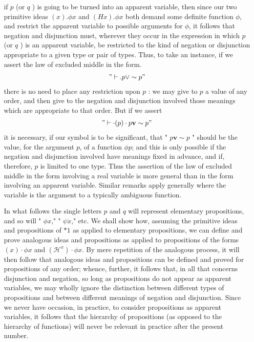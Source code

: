 \documentclass[10pt]{article}
\begin{document}
if $p$ (or $q$ ) is going to be turned into an apparent variable, then since our two primitive ideas $(x) . \phi x$ and $(H x) . \phi x$ both demand some definite function $\phi$, and restrict the apparent variable to possible arguments for $\phi$, it follows that negation and disjunction must, wherever they occur in the expression in which $p$ (or $q$ ) is an apparent variable, be restricted to the kind of negation or disjunction\\
appropriate to a given type or pair of types. Thus, to take an instance, if we assert the law of excluded middle in the form.
$$
" \vdash . p \vee \sim p "
$$
there is no need to place any restriction upon $p$ : we may give to $p$ a value of any order, and then give to the negation and disjunction involved those meanings which are appropriate to that order. But if we assert
$$
" \vdash \cdot(p) \cdot p \mathbf{v} \sim p "
$$
it is necessary, if our symbol is to be significant, that " $p \mathbf{v} \sim p$ " should be the value, for the argument $p$, of a function $\phi p$; and this is only possible if the negation and disjunction involved have meanings fixed in advance, and if, therefore, $p$ is limited to one type. Thus the assertion of the law of excluded middle in the form involving a real variable is more general than in the form involving an apparent variable. Similar remarks apply generally where the variable is the argument to a typically ambiguous function.

In what follows the single letters $p$ and $q$ will represent elementary propositions, and so will " $\phi x$," " $\psi \ddot{x}$," etc. We shall show how, assuming the primitive ideas and propositions of $* 1$ as applied to elementary propositions, we can define and prove analogous ideas and propositions as applied to propositions of the forms $(x) \cdot \phi x$ and $\left(\mathcal{H}^{x}\right) \cdot \phi x$. By mere repetition of the analogous process, it will then follow that analogous ideas and propositions can be defined and proved for propositions of any order; whence, further, it follows that, in all that concerns disjunction and negation, so long as propositions do not appear as apparent variables, we may wholly ignore the distinction between different types of propositions and between different meanings of negation and disjunction. Since we never have occasion, in practice, to consider propositions as apparent variables, it follows that the hierarchy of propositions (as opposed to the hierarchy of functions) will never be relevant in practice after the present number.
\end{document}

